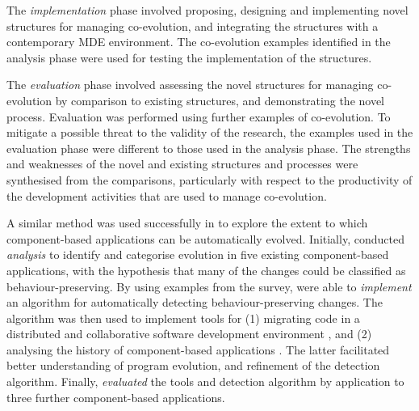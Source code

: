 The \emph{implementation} phase involved proposing, designing and implementing novel structures for managing co-evolution, and integrating the structures with a contemporary MDE environment. The co-evolution examples identified in the analysis phase were used for testing the implementation of the structures.

The \emph{evaluation} phase involved assessing the novel structures for managing co-evolution by comparison to existing structures, and demonstrating the novel process. Evaluation was performed using further examples of co-evolution. To mitigate a possible threat to the validity of the research, the examples used in the evaluation phase were different to those used in the analysis phase. The strengths and weaknesses of the novel and existing structures and processes were synthesised from the comparisons, particularly with respect to the productivity of the development activities that are used to manage co-evolution.

A similar method was used successfully in \cite{dig07thesis} to explore the extent to which component-based applications can be automatically evolved. Initially, \cite{dig06apis} conducted \emph{analysis} to identify and categorise evolution in five existing component-based applications, with the hypothesis that many of the changes could be classified as behaviour-preserving. By using examples from the survey, \cite{dig06detection} were able to \emph{implement} an algorithm for automatically detecting behaviour-preserving changes. The algorithm was then used to implement tools for (1) migrating code in a distributed and collaborative software development environment \cite{dig06automatic}, and (2) analysing the history of component-based applications \cite{dig07cms}. The latter facilitated better understanding of program evolution, and refinement of the detection algorithm. Finally, \cite{dig07thesis} \emph{evaluated} the tools and detection algorithm by application to three further component-based applications.